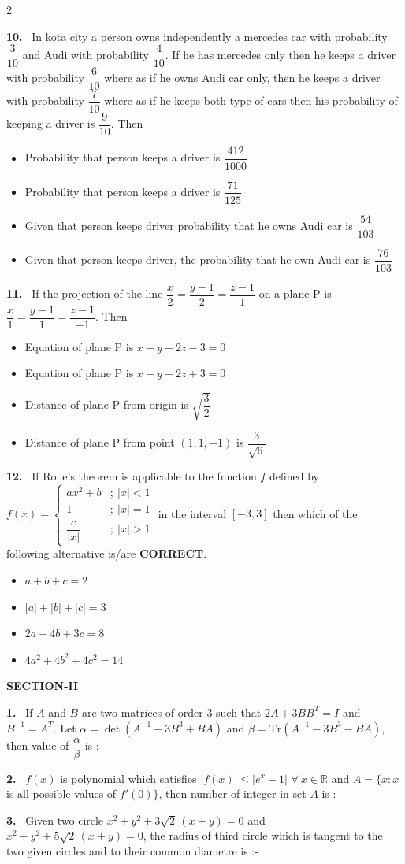 \documentclass[10pt]{extarticle}
\newcommand{\sect}[1]{\par\smallskip\noindent\textbf{#1}\par}
\newcommand{\qn}[1]{\par\smallskip\noindent\textbf{#1.}~}
\newenvironment{qoptions}{\begin{itemize}[leftmargin=1.8em,itemsep=1pt,topsep=2pt,label={}]}{\end{itemize}}
\newcommand{\opt}[2]{\item[(#1)] #2}
\begin{document}
\begin{multicols}{2}
\qn{10} In kota city a person owns independently a mercedes car with probability $\dfrac{3}{10}$ and Audi with probability $\dfrac{4}{10}$. If he has mercedes only then he keeps a driver with probability $\dfrac{6}{10}$ where as if he owns Audi car only, then he keeps a driver with probability $\dfrac{7}{10}$ where as if he keeps both type of cars then his probability of keeping a driver is $\dfrac{9}{10}$. Then
\begin{qoptions}
\opt{A}{Probability that person keeps a driver is $\dfrac{412}{1000}$}
\opt{B}{Probability that person keeps a driver is $\dfrac{71}{125}$}
\opt{C}{Given that person keeps driver probability that he owns Audi car is $\dfrac{54}{103}$}
\opt{D}{Given that person keeps driver, the probability that he own Audi car is $\dfrac{76}{103}$}
\end{qoptions}

\qn{11} If the projection of the line $\dfrac x2=\dfrac{y-1}{2}=\dfrac{z-1}{1}$ on a plane P is $\dfrac x1=\dfrac{y-1}{1}=\dfrac{z-1}{-1}$. Then
\begin{qoptions}
\opt{A}{Equation of plane P is $x+y+2z-3=0$}
\opt{B}{Equation of plane P is $x+y+2z+3=0$}
\opt{C}{Distance of plane P from origin is $\sqrt{\dfrac32}$}
\opt{D}{Distance of plane P from point $(1,1,-1)$ is $\dfrac{3}{\sqrt6}$}
\end{qoptions}

\qn{12} If Rolle's theorem is applicable to the function $f$ defined by $f(x)=\begin{cases}ax^2+b & ;\ |x|<1\\ 1 & ;\ |x|=1\\ \dfrac{c}{|x|} & ;\ |x|>1\end{cases}$ in the interval $[-3,3]$ then which of the following alternative is/are \textbf{CORRECT}.
\begin{qoptions}
\opt{A}{$a+b+c=2$}
\opt{B}{$|a|+|b|+|c|=3$}
\opt{C}{$2a+4b+3c=8$}
\opt{D}{$4a^2+4b^2+4c^2=14$}
\end{qoptions}

\sect{SECTION-II}
\qn{1} If $A$ and $B$ are two matrices of order 3 such that $2A+3BB^T=I$ and $B^{-1}=A^T$. Let $\alpha=\det(A^{-1}-3B^3+BA)$ and $\beta=\text{Tr}(A^{-1}-3B^3-BA)$, then value of $\dfrac\alpha\beta$ is :

\qn{2} $f(x)$ is polynomial which satisfies $|f(x)|\le|e^x-1|$ $\forall\ x\in\mathbb R$ and $A=\{x:x$ is all possible values of $f'(0)\}$, then number of integer in set $A$ is :

\qn{3} Given two circle $x^2+y^2+3\sqrt2\,(x+y)=0$ and $x^2+y^2+5\sqrt2\,(x+y)=0$, the radius of third circle which is tangent to the two given circles and to their common diametre is :-


\end{multicols}
\end{document}
